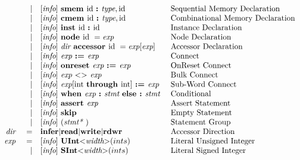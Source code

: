 \documentclass[12pt]{article}
\begin{document}
{\[\begin{array}{rrll}
                &\vert &[\text{\em info}]\  \text{\bf smem\ } \text{id } \text{\bf :\ } \text{\em type} , \text{id}                                  &\text{Sequential Memory Declaration}\\
                &\vert &[\text{\em info}]\  \text{\bf cmem\ } \text{id } \text{\bf :\ } \text{\em type} , \text{id}                                  &\text{Combinational Memory Declaration}\\
                &\vert &[\text{\em info}]\  \text{\bf inst\ } \text{id } \text{\bf :\ } \text{id }                                                &\text{Instance Declaration}\\
                &\vert &[\text{\em info}]\  \text{\bf node\ } \text{id }  = \text{\em exp\ }                                               &\text{Node Declaration}\\
                &\vert &[\text{\em info}]\  \text{\em dir\ } \text{\bf accessor\ } \text{id } = \text{\em exp}[\text{\em exp}]                       &\text{Accessor Declaration}\\
                &\vert &[\text{\em info}]\  \text{\em exp\ } \text{\bf :=\ } \text{\em exp\ }                                               &\text{Connect}\\
                &\vert &[\text{\em info}]\  \text{\bf onreset\ } \text{\em exp\ } \text{\bf :=\ } \text{\em exp\ }                                  &\text{OnReset Connect}\\
                &\vert &[\text{\em info}]\  \text{\em exp\ } \text{\bf $<>$\ } \text{\em exp\ }                                             &\text{Bulk Connect}\\
                &\vert &[\text{\em info}]\  \text{\em exp}[\text{int }  \text{\bf through\ } \text{int}] \ \text{\bf :=\ } \text{\em exp}               &\text{Sub-Word Connect}\\
                &\vert &[\text{\em info}]\  \text{\bf when\ } \text{\em exp\ } \text{\bf :\ } \text{\em stmt\ } \text{\bf else :\ } \text{\em stmt\ }               &\text{Conditional}\\
                &\vert &[\text{\em info}]\  \text{\bf assert\ } \text{\em exp\ }                                                    &\text{Assert Statement}\\
                &\vert &[\text{\em info}]\  \text{\bf skip\ }                                                               &\text{Empty Statement}\\
                &\vert &[\text{\em info}]\  (\text{\em stmt*\ })                                                            &\text{Statement Group}\\
\text{\em dir\ }        &=     &\text{\bf infer} \vert \text{\bf read} \vert \text{\bf write} \vert \text{\bf rdwr\ }                &\text{Accessor Direction}\\
\text{\em exp\ }        &=     &[\text{\em info}]\  \text{\bf UInt} \text{\bf $<$} \text{\em width} \text{\bf $>$}(ints)                        &\text{Literal Unsigned Integer}\\
                &\vert &[\text{\em info}]\  \text{\bf SInt} \text{\bf $<$} \text{\em width} \text{\bf $>$}(ints)                        &\text{Literal Signed Integer}\\

\end{array}\]}
\end{document}
